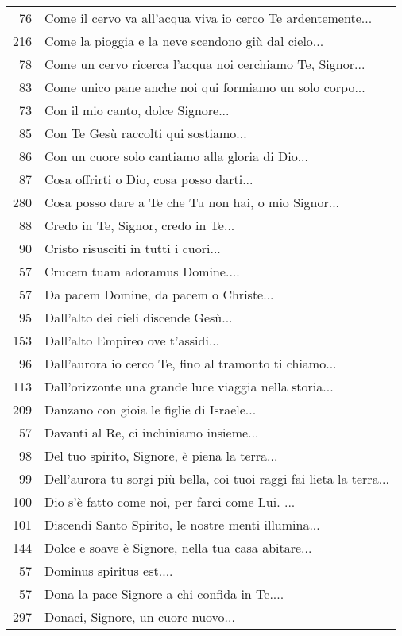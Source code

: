 {\begin{flushleft}
\begin{longtable}{r m{11cm}}
    76 & Come il cervo va all'acqua viva io cerco Te ardentemente...\\
    216 & Come la pioggia e la neve scendono giù dal cielo...\\
    78 & Come un cervo ricerca l'acqua noi cerchiamo Te, Signor...\\
    83 & Come unico pane anche noi qui formiamo un solo corpo...\\
    73 & Con il mio canto, dolce Signore...\\
    85 & Con Te Gesù raccolti qui sostiamo...\\
    86 & Con un cuore solo cantiamo alla gloria di Dio...\\
    87 & Cosa offrirti o Dio, cosa posso darti...\\
    280 & Cosa posso dare a Te che Tu non hai, o mio Signor...\\
    88 & Credo in Te, Signor, credo in Te...\\
    90 & Cristo risusciti in tutti i cuori...\\
    57 & Crucem tuam adoramus Domine....\\
    57 & Da pacem Domine, da pacem o Christe...\\
    95 & Dall'alto dei cieli discende Gesù...\\
    153 & Dall'alto Empireo ove t'assidi...\\
    96 & Dall'aurora io cerco Te, fino al tramonto ti chiamo...\\
    113 & Dall'orizzonte una grande luce viaggia nella storia...\\
    209 & Danzano con gioia le figlie di Israele...\\
    57 & Davanti al Re, ci inchiniamo insieme...\\
    98 & Del tuo spirito, Signore,  è piena la terra...\\
    99 & Dell'aurora tu sorgi più bella, coi tuoi raggi fai lieta la terra...\\
    100 & Dio s'è fatto come noi, per farci come Lui. ...\\
    101 & Discendi Santo Spirito, le nostre menti illumina...\\
    144 & Dolce e soave è Signore, nella tua casa abitare...\\
    57 & Dominus spiritus est....\\
    57 & Dona la pace Signore a chi confida in Te....\\
    297 & Donaci, Signore, un cuore nuovo...\\

\end{longtable}
\end{flushleft}}
